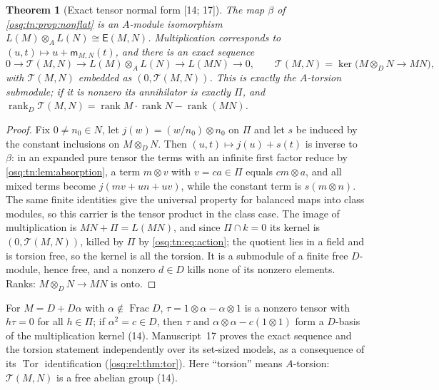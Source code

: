 \documentclass[11pt,letterpaper]{article}
\numberwithin{equation}{section}
\newtheorem{theorem}{Theorem}[section]
\theoremstyle{definition}
\theoremstyle{remark}
\theoremstyle{plain}
\newcommand{\Frac}{\operatorname{Frac}}
\newcommand{\Tor}{\operatorname{Tor}}
\newcommand{\rk}{\operatorname{rank}}
\newcommand{\src}[1]{\textup{\textsf{[#1]}}}
\begin{document}
\begin{theorem}[Exact tensor normal form \src{14; 17}]\label{osq:tn:thm:tensor}
The map $\beta$ of \cref{osq:tn:prop:nonflat} is an $A$-module isomorphism $L(M)\otimes_AL(N)\cong\mathsf E(M,N)$. Multiplication
corresponds to $(u,t)\mapsto u+\mathsf m_{M,N}(t)$, and there is an exact sequence
\[
 0\longrightarrow\mathcal T(M,N)\longrightarrow L(M)\otimes_AL(N)\longrightarrow L(MN)\longrightarrow0,\qquad
 \mathcal T(M,N)=\ker\bigl(M\otimes_DN\to MN\bigr),
\]
with $\mathcal T(M,N)$ embedded as $(0,\mathcal T(M,N))$. This is exactly the $A$-torsion submodule; if it is nonzero its annihilator is
exactly $\Pi$, and $\rk_D\mathcal T(M,N)=\rk M\cdot\rk N-\rk(MN)$.
\end{theorem}
\begin{proof}
Fix $0\ne n_0\in N$, let $j(w)=(w/n_0)\otimes n_0$ on $\Pi$ and let $s$ be induced by the constant inclusions on $M\otimes_DN$. Then
$(u,t)\mapsto j(u)+s(t)$ is inverse to $\beta$: in an expanded pure tensor the terms with an infinite first factor reduce by
\cref{osq:tn:lem:absorption}, a term $m\otimes v$ with $v=ca\in\Pi$ equals $cm\otimes a$, and all mixed terms become
$j(mv+un+uv)$, while the constant term is $s(m\otimes n)$. The same finite identities give the universal property for balanced maps
into class modules, so this carrier is the tensor product in the class case. The image of multiplication is $MN+\Pi=L(MN)$, and since
$\Pi\cap k=0$ its kernel is $(0,\mathcal T(M,N))$, killed by $\Pi$ by \eqref{osq:tn:eq:action}; the quotient lies in a field and is
torsion free, so the kernel is all the torsion. It is a submodule of a finite free $D$-module, hence free, and a nonzero $d\in D$
kills none of its nonzero elements. Ranks: $M\otimes_DN\to MN$ is onto.
\end{proof}

For $M=D+D\alpha$ with $\alpha\notin\Frac D$, $\tau=1\otimes\alpha-\alpha\otimes1$ is a nonzero tensor with $h\tau=0$ for all
$h\in\Pi$; if $\alpha^2=c\in D$, then $\tau$ and $\alpha\otimes\alpha-c(1\otimes1)$ form a $D$-basis of the multiplication kernel (14).
Manuscript~17 proves the exact sequence and the torsion statement independently over its set-sized models, as a consequence of
its $\Tor$ identification (\cref{osq:rel:thm:tor}).
Here ``torsion'' means $A$-torsion: $\mathcal T(M,N)$ is a free abelian group (14).
\end{document}
